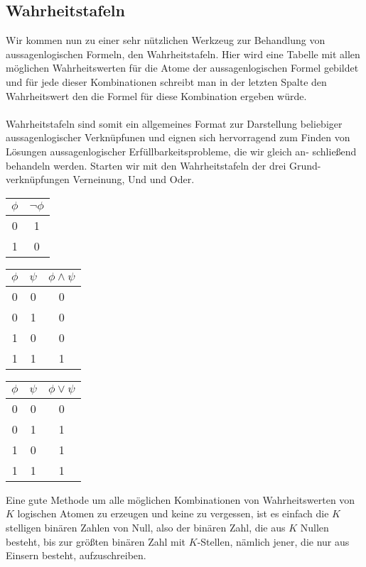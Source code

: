 \documentclass[11pt,a4paper,leqno]{report}
\numberwithin{equation}{chapter}
\begin{document}
\subsection{Wahrheitstafeln}
Wir kommen nun zu einer sehr nützlichen Werkzeug zur Behandlung von aussagenlogischen Formeln, den Wahrheitstafeln. Hier wird eine Tabelle mit allen möglichen Wahrheitswerten für die Atome der aussagenlogischen Formel gebildet und für jede dieser Kombinationen schreibt man in der letzten Spalte den Wahrheitswert den die Formel für diese Kombination ergeben würde.\\
\\
Wahrheitstafeln sind somit ein allgemeines Format zur Darstellung beliebiger aussagenlogischer Verknüpfunen und eignen sich hervorragend zum Finden von Lösungen aussagenlogischer Erfüllbarkeitsprobleme, die wir gleich an- schließend behandeln werden.
Starten wir mit den Wahrheitstafeln der drei Grund- verknüpfungen Verneinung, Und und Oder.
\begin{center}
\begin{minipage}{1.0in}
	\begin{tabular}{|c|c|}
	$\phi$ & $\neg\phi$\\
	\hline
	0 & 1\\
	1 & 0\\
	\end{tabular}
\end{minipage}
\begin{minipage}{1.5in}
	\begin{tabular}{|c c|c|}
	$\phi$ & $\psi$ & $\phi \wedge \psi$\\
	\hline
	0 & 0 & 0\\
	0 & 1 & 0\\
	1 & 0 & 0\\
	1 & 1 & 1\\
	\end{tabular}  
\end{minipage}
\begin{minipage}{1.5in}
	\begin{tabular}{|c c|c|}
	$\phi$ & $\psi$ & $\phi \vee \psi$\\
	\hline
	0 & 0 & 0\\
	0 & 1 & 1\\
	1 & 0 & 1\\
	1 & 1 & 1\\
	\end{tabular}  
\end{minipage}
\end{center}
Eine gute Methode um alle möglichen Kombinationen von Wahrheitswerten von $K$ logischen Atomen zu erzeugen und keine zu vergessen, ist es einfach die $K$ stelligen binären Zahlen von Null, also der binären Zahl, die aus $K$ Nullen besteht, bis zur größten binären Zahl mit $K$-Stellen, nämlich jener, die nur aus Einsern besteht, aufzuschreiben.\\
\end{document}
